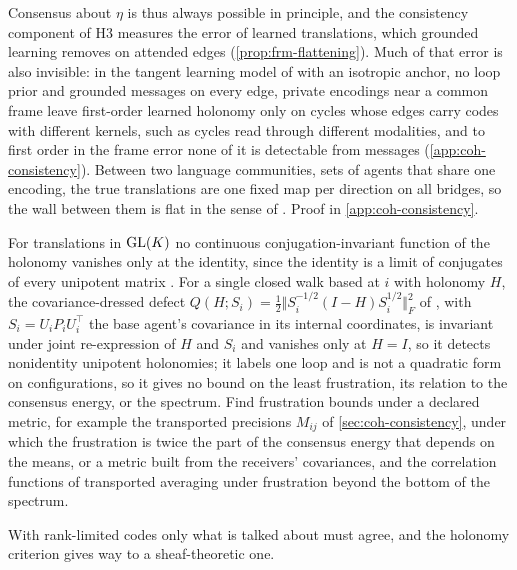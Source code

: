 Consensus about $\eta$ is thus always possible in principle, and the consistency component of H3 measures the error of learned translations, which grounded learning removes on attended edges (\cref{prop:frm-flattening}). Much of that error is also invisible: in the tangent learning model of \citet{dennis2026magent} with an isotropic anchor, no loop prior and grounded messages on every edge, private encodings near a common frame leave first-order learned holonomy only on cycles whose edges carry codes with different kernels, such as cycles read through different modalities, and to first order in the frame error none of it is detectable from messages (\cref{app:coh-consistency}). Between two language communities, sets of agents that share one encoding, the true translations are one fixed map per direction on all bridges, so the wall between them is flat in the sense of \citet{dennis2026magent}. Proof in \cref{app:coh-consistency}.

\begin{openproblem}\label{open:coh-frustration-metric}
For translations in $\mathrm{GL}(K)$ no continuous conjugation-invariant function of the holonomy vanishes only at the identity, since the identity is a limit of conjugates of every unipotent matrix \citep{dennis2026magent}. For a single closed walk based at $i$ with holonomy $H$, the covariance-dressed defect $Q(H;S_i)=\tfrac12\Vert S_i^{-1/2}(I-H)S_i^{1/2}\Vert_F^2$ of \citet{dennis2026magent}, with $S_i=U_iP_iU_i^\top$ the base agent's covariance in its internal coordinates, is invariant under joint re-expression of $H$ and $S_i$ and vanishes only at $H=I$, so it detects nonidentity unipotent holonomies; it labels one loop and is not a quadratic form on configurations, so it gives no bound on the least frustration, its relation to the consensus energy, or the spectrum. Find frustration bounds under a declared metric, for example the transported precisions $M_{ij}$ of \cref{sec:coh-consistency}, under which the frustration is twice the part of the consensus energy that depends on the means, or a metric built from the receivers' covariances, and the correlation functions of transported averaging under frustration beyond the bottom of the spectrum.
\end{openproblem}

With rank-limited codes only what is talked about must agree, and the holonomy criterion gives way to a sheaf-theoretic one.

